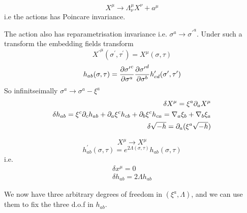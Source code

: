 \documentclass{article}
\begin{document}
\begin{definition}
\[
X^\mu \to \Lambda^\mu_\nu X^\nu + a^\mu
\]
i.e the actions has Poincare invariance. 
\end{definition}

The action also has reparametrisation invariance i.e. $\sigma^a \to {\sigma^\prime}^a$. Under such a transform the embedding fields transform 
\[
{X^\prime}^\mu(\sigma^\prime,\tau^\prime) = {X}^\mu(\sigma,\tau)
\]
\[
h_{ab}(\sigma,\tau) = \pd[{\sigma^\prime}^c]{\sigma^a} \pd[{\sigma^\prime}^d]{\sigma^b} h^\prime_{cd} (\sigma^\prime, \tau^\prime)
\]
So infinitseimally $\sigma^a \to \sigma^a - \xi^a$
\begin{align*}
    \delta X^\mu = \xi^a \del_a X^\mu \\
    \delta h_{ab} = \xi^c \del_c h_{ab} + \del_a \xi^c h_{cb} + \del_b \xi^c h_{ca} = \nabla_a\xi_b + \nabla_b \xi_a \\
    \delta \sqrt{-h} = \del_a(\xi^a \sqrt{-h})
\end{align*}

\begin{definition}
\[
X^\mu \to X^\mu
\]
\[
h^\prime_{ab}(\sigma,\tau) = e^{2\Lambda(\sigma,\tau)} h_{ab}(\sigma,\tau)
\]
i.e. 
\begin{align*}
    \delta x^\mu = 0 \\
    \delta h_{ab} = 2\Lambda h_{ab}
\end{align*}
\end{definition}

We now have three arbitrary degrees of freedom in $(\xi^a,\Lambda)$, and we can use them to fix the three d.o.f in $h_{ab}$. 
\end{document}
